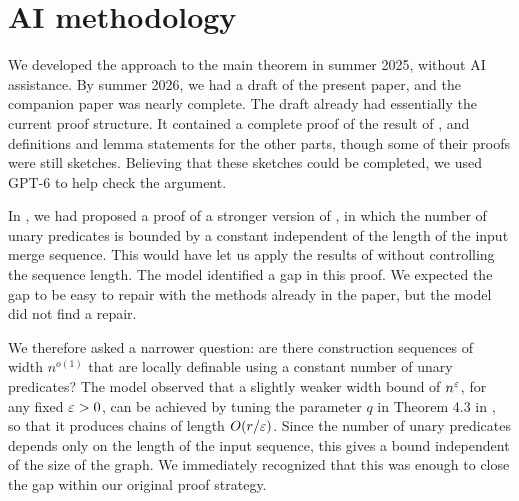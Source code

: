 \documentclass[11pt]{article}
\begin{document}
\newpage
\setcounter{tocdepth}{1}
\tableofcontents

\clearpage
\pagestyle{plain}





\clearpage


\clearpage


\clearpage





\section*{AI methodology}
We developed the approach to the main theorem in summer 2025, without AI assistance.
By summer 2026, we had a draft of the present paper, and the companion paper \cite{md-abmw} was nearly complete.
The draft already had essentially the current proof structure.
It contained a complete proof of the result of , and definitions and lemma statements for the other parts, though some of their proofs were still sketches.
Believing that these sketches could be completed, we used GPT-6 to help check the argument.

In , we had proposed a proof of a stronger version of , in which the number of unary predicates is bounded by a constant independent of the length of the input merge sequence.
This would have let us apply the results of \cite{md-abmw} without controlling the sequence length.
The model identified a gap in this proof.
We expected the gap to be easy to repair with the methods already in the paper, but the model did not find a repair.

We therefore asked a narrower question: are there construction sequences of width $n^{o(1)}$ that are locally definable using a constant number of unary predicates?
The model observed that a slightly weaker width bound of $n^\varepsilon$, for any fixed $\varepsilon>0$, can be achieved by tuning the parameter $q$ in Theorem 4.3 in \cite{md-abmw}, so that it produces chains of length $O(r/\varepsilon)$.
Since the number of unary predicates depends only on the length of the input sequence, this gives a bound independent of the size of the graph.
We immediately recognized that this was enough to close the gap within our original proof strategy.
\end{document}

